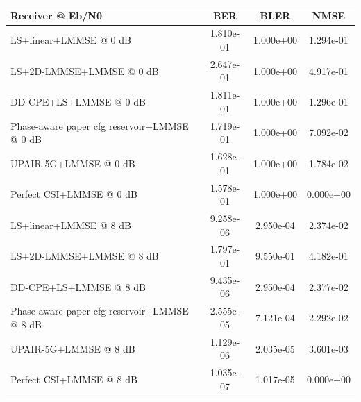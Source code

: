 \begin{tabular}{lccc}
\toprule
Receiver @ Eb/N0 & BER & BLER & NMSE \\
\midrule
LS+linear+LMMSE @ 0 dB & 1.810e-01 & 1.000e+00 & 1.294e-01 \\
LS+2D-LMMSE+LMMSE @ 0 dB & 2.647e-01 & 1.000e+00 & 4.917e-01 \\
DD-CPE+LS+LMMSE @ 0 dB & 1.811e-01 & 1.000e+00 & 1.296e-01 \\
Phase-aware paper cfg reservoir+LMMSE @ 0 dB & 1.719e-01 & 1.000e+00 & 7.092e-02 \\
UPAIR-5G+LMMSE @ 0 dB & 1.628e-01 & 1.000e+00 & 1.784e-02 \\
Perfect CSI+LMMSE @ 0 dB & 1.578e-01 & 1.000e+00 & 0.000e+00 \\
\midrule
LS+linear+LMMSE @ 8 dB & 9.258e-06 & 2.950e-04 & 2.374e-02 \\
LS+2D-LMMSE+LMMSE @ 8 dB & 1.797e-01 & 9.550e-01 & 4.182e-01 \\
DD-CPE+LS+LMMSE @ 8 dB & 9.435e-06 & 2.950e-04 & 2.377e-02 \\
Phase-aware paper cfg reservoir+LMMSE @ 8 dB & 2.555e-05 & 7.121e-04 & 2.292e-02 \\
UPAIR-5G+LMMSE @ 8 dB & 1.129e-06 & 2.035e-05 & 3.601e-03 \\
Perfect CSI+LMMSE @ 8 dB & 1.035e-07 & 1.017e-05 & 0.000e+00 \\
\bottomrule
\end{tabular}